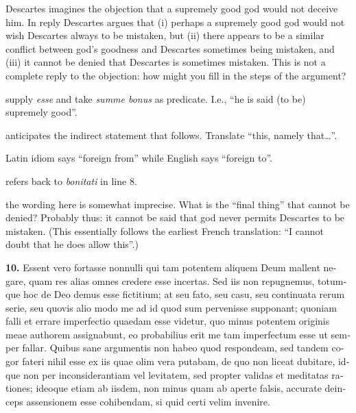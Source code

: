  Descartes imagines the objection that a supremely good god would not deceive him. In reply Descartes argues that (i) perhaps a supremely good god would not wish Descartes always to be mistaken, but (ii) there appears to be a similar conflict between god's goodness and Descartes sometimes being mistaken, and (iii) it cannot be denied that Descartes is sometimes mistaken. This is not a complete reply to the objection: how might you fill in the steps of the argument?

 supply \textit{esse} and take \textit{summe bonus} as predicate. I.e., ``he is said (to be) supremely good''.

 anticipates the indirect statement that follows. Translate ``this, namely that\dots''.

 Latin idiom says ``foreign from'' while English says ``foreign to''.

 refers back to \textit{bonitati} in line 8.

 the wording here is somewhat imprecise. What is the ``final thing'' that cannot be denied? Probably thus: it cannot be said that god never permits Descartes to be mistaken. (This essentially follows the earliest French translation: ``I cannot doubt that he does allow this''.)

\clearpage

\beginnumbering
\pstart
\begin{latin}
    \textenglish{\textbf{10.}} Essent vero fortasse nonnulli qui tam potentem aliquem Deum mallent negare, quam res alias omnes credere esse incertas. Sed iis non repugnemus, totumque hoc de Deo demus esse fictitium; at seu fato, seu casu, seu continuata rerum serie, seu quovis alio modo me ad id quod sum pervenisse supponant; quoniam falli et errare imperfectio quaedam esse videtur, quo minus potentem originis meae authorem assignabunt, eo probabilius erit me tam imperfectum esse ut semper fallar. Quibus sane argumentis non habeo quod respondeam, sed tandem cogor fateri nihil esse ex iis quae olim vera putabam, de quo non liceat dubitare, idque non per inconsiderantiam vel levitatem, sed propter validas et meditatas rationes; ideoque etiam ab iisdem, non minus quam ab aperte falsis, accurate deinceps assensionem esse cohibendam, si quid certi velim invenire.
\end{latin}
\pend
\endnumbering

